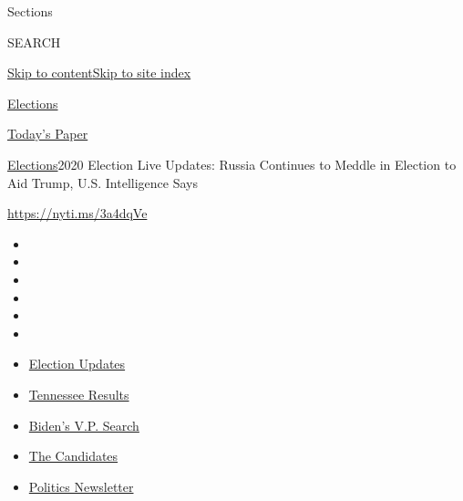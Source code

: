 Sections

SEARCH

\protect\hyperlink{site-content}{Skip to
content}\protect\hyperlink{site-index}{Skip to site index}

\href{https://www.nytimes3xbfgragh.onion/news-event/2020-election}{Elections}

\href{https://myaccount.nytimes3xbfgragh.onion/auth/login?response_type=cookie\&client_id=vi}{}

\href{https://www.nytimes3xbfgragh.onion/section/todayspaper}{Today's
Paper}

\href{/news-event/2020-election}{Elections}\textbar{}2020 Election Live
Updates: Russia Continues to Meddle in Election to Aid Trump, U.S.
Intelligence Says

\url{https://nyti.ms/3a4dqVe}

\begin{itemize}
\item
\item
\item
\item
\item
\item
\end{itemize}

\begin{itemize}
\item
  \href{https://www.nytimes3xbfgragh.onion/2020/08/07/us/elections/biden-vs-trump.html?action=click\&pgtype=Article\&state=default\&region=TOP_BANNER\&context=storylines_menu}{Election
  Updates}
\item
  \href{https://www.nytimes3xbfgragh.onion/interactive/2020/08/06/us/elections/results-tennessee-primary-elections.html?action=click\&pgtype=Article\&state=default\&region=TOP_BANNER\&context=storylines_menu}{Tennessee
  Results}
\item
  \href{https://www.nytimes3xbfgragh.onion/article/biden-vice-president-2020.html?action=click\&pgtype=Article\&state=default\&region=TOP_BANNER\&context=storylines_menu}{Biden's
  V.P. Search}
\item
  \href{https://www.nytimes3xbfgragh.onion/interactive/2019/us/politics/2020-presidential-candidates.html?action=click\&pgtype=Article\&state=default\&region=TOP_BANNER\&context=storylines_menu}{The
  Candidates}
\item
  \href{https://www.nytimes3xbfgragh.onion/newsletters/politics?action=click\&pgtype=Article\&state=default\&region=TOP_BANNER\&context=storylines_menu}{Politics
  Newsletter}
\end{itemize}


